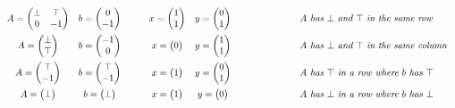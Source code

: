 \documentclass[]{article}
\renewcommand{\.}{\hskip .75pt}
\begin{document}
$$
\begin{array}{cc@{\hspace{30pt}}ccc@{\hspace{60pt}}l}
A =
\begin{pmatrix}
	\bot & \top \\
	0 & -1
\end{pmatrix}
&
b = \begin{pmatrix} 0 \\ -1 \end{pmatrix}
&
x = \begin{pmatrix} 1 \\ 1 \end{pmatrix}
&
y = \begin{pmatrix} 0 \\ 1 \end{pmatrix}
&
&\mbox{ \em $A$ has $\bot$ and $\top$ in the same row}
%
\vspace{5pt} \\
%
A = \begin{pmatrix} \bot \\ \top \end{pmatrix}
&
b = \begin{pmatrix} -1 \\ 0 \end{pmatrix}
&
x = \begin{pmatrix} 0 \end{pmatrix}
&
y = \begin{pmatrix} 1 \\ 1 \end{pmatrix}
&
&\mbox{ \em $A$ has $\bot$ and $\top$ in the same column}
%
\vspace{5pt} \\
%
A = \begin{pmatrix} \top \\ -1 \end{pmatrix}
&
b = \begin{pmatrix} \top \\ -1 \end{pmatrix}
&
x = \begin{pmatrix} 1 \end{pmatrix}
&
y = \begin{pmatrix} 0 \\ 1 \end{pmatrix}
&
&\mbox{ \em $A$ has $\top$ in a row where $b$ has $\top$}
%
\vspace{5pt} \\
%
A = \begin{pmatrix} \bot \end{pmatrix}
&
b = \begin{pmatrix} \bot \end{pmatrix}
&
x = \begin{pmatrix} 1 \end{pmatrix}
&
y = \begin{pmatrix} 0 \end{pmatrix}
&
&\mbox{ \em $A$ has $\bot$ in a row where $b$ has $\bot$}
\end{array}
$$
\end{document}
